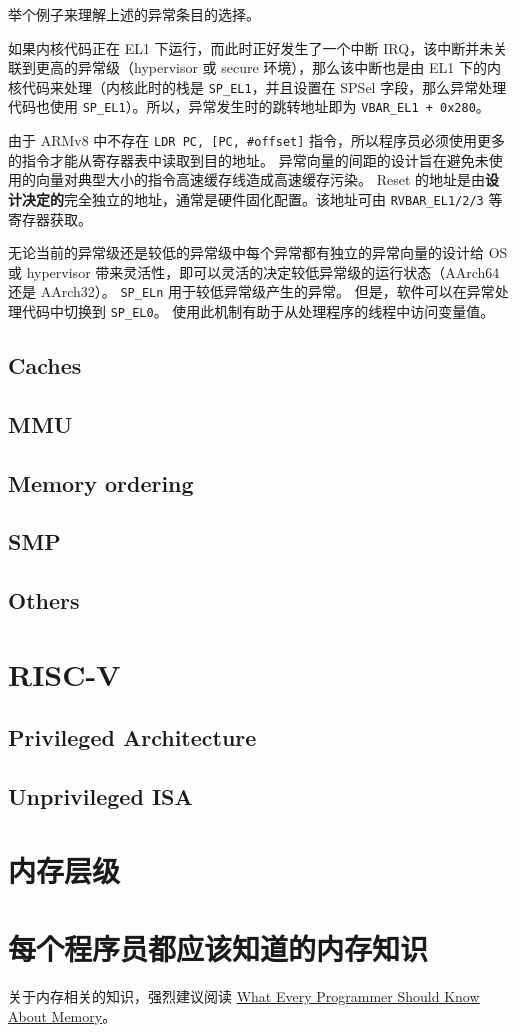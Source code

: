 举个例子来理解上述的异常条目的选择。

如果内核代码正在 EL1 下运行，而此时正好发生了一个中断 IRQ，该中断并未关联到更高的异常级（hypervisor 或 secure 环境），那么该中断也是由 EL1 下的内核代码来处理（内核此时的栈是 \lstinline!SP_EL1!，并且设置在 SPSel 字段，那么异常处理代码也使用 \lstinline!SP_EL1!）。所以，异常发生时的跳转地址即为 \lstinline!VBAR_EL1 + 0x280!。

由于 ARMv8 中不存在 \lstinline!LDR PC, [PC, #offset]! 指令，所以程序员必须使用更多的指令才能从寄存器表中读取到目的地址。
异常向量的间距的设计旨在避免未使用的向量对典型大小的指令高速缓存线造成高速缓存污染。
Reset 的地址是由\textbf{设计决定的}完全独立的地址，通常是硬件固化配置。该地址可由 \lstinline!RVBAR_EL1/2/3! 等寄存器获取。

无论当前的异常级还是较低的异常级中每个异常都有独立的异常向量的设计给 OS 或 hypervisor 带来灵活性，即可以灵活的决定较低异常级的运行状态（AArch64 还是 AArch32）。
\lstinline!SP_ELn! 用于较低异常级产生的异常。
但是，软件可以在异常处理代码中切换到 \lstinline!SP_EL0!。
使用此机制有助于从处理程序的线程中访问变量值。

\subsection{Caches}

\subsection{MMU}

\subsection{Memory ordering} \label{sec:memory-ordering}

\subsection{SMP}

\subsection{Others}

\section{RISC-V}

\subsection{Privileged Architecture}

\subsection{Unprivileged ISA}

\section{内存层级}

\section{每个程序员都应该知道的内存知识}

关于内存相关的知识，强烈建议阅读
\href{https://people.freebsd.org/~lstewart/articles/cpumemory.pdf}{What Every Programmer Should Know About Memory}。


